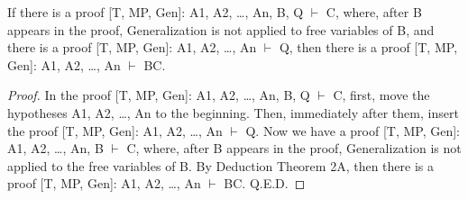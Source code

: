 \begin{corollary}
If there is a proof [T, MP, Gen]: A1, A2, \ldots , An, B, Q \(\vdash\) C, where, after B appears in the
proof, Generalization is not applied to free variables of B, and there is a proof [T, MP, Gen]: A1, A2, \ldots ,
An \(\vdash\) Q, then there is a proof [T, MP, Gen]: A1, A2, \ldots , An \(\vdash\) B\IMPLIES C.
\end{corollary}

\begin{proof}
In the proof [T, MP, Gen]: A1, A2, \ldots , An, B, Q \(\vdash\) C, first, move the hypotheses A1, A2, \ldots , An to the
beginning. Then, immediately after them, insert the proof [T, MP, Gen]: A1, A2, \ldots , An \(\vdash\) Q. Now we have
a proof [T, MP, Gen]: A1, A2, \ldots , An, B \(\vdash\) C, where, after B appears in the proof, Generalization is not
applied to the free variables of B. By Deduction Theorem 2A, then there is a proof [T, MP, Gen]: A1,
A2, \ldots , An \(\vdash\) B\IMPLIES C. Q.E.D.
\end{proof}

